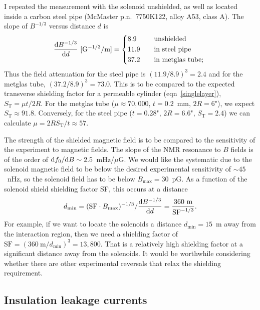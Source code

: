 I repeated the measurement with the solenoid unshielded, as well as located
inside a carbon steel pipe (McMaster p.n.\ 7750K122, alloy A53, class A). The
slope of $B^{-1/3}$ versus distance $d$ is
%
\[
    \frac{\d B^{-1/3}}{\d d}
    ~[\text{G}^{-1/3}/\text{m}]
    =
    \begin{dcases*}
         8.9&\quad unshielded\\
        11.9&\quad in steel pipe\\
        37.2&\quad in metglas tube;
    \end{dcases*}
\]
%
Thus the field attenuation for the steel pipe is $(11.9/8.9)^3=2.4$ and for the
metglas tube, $(37.2/8.9)^3=73.0$. This is to be compared to the expected
transverse shielding factor for a permeable cylinder (eqn~\ref{singlelayer}), 
$S_\text{T}=\mu t/2R$. For the metglas tube ($\mu\approx70,000$,
$t=0.2$~mm, $2R=6$"), we expect $S_\text{T}\approx91.8$. Conversely, for the
steel pipe ($t=0.28$", $2R=6.6$", $S_\text{T}=2.4$) we can calculate
$\mu=2RS_\text{T}/t\approx57$.

The strength of the shielded magnetic field is to be compared to the sensitivity
of the experiment to magnetic fields. The slope of the \gls{NMR} resonance to
$B$ fields is of the order of $\mathrm{d} f_0/\mathrm{d} B\sim2.5$~mHz/$\mu$G. We would like the
systematic due to the solenoid magnetic field to be below the desired
experimental sensitivity of $\sim45$~nHz, so the solenoid field has to be below
$B_\text{max}=30$~pG. As a function of the solenoid shield shielding factor SF,
this occurs at a distance
%
\[
    d_\text{min}=
    (\text{SF}\cdot B_\text{max})^{-1/3}/
    \frac{\mathrm{d} B^{-1/3}}{\mathrm{d} d}
    =
    \frac{360~\text{m}}{\text{SF}^{-1/3}}.
\]
%
For example, if we want to locate the solenoids a distance $d_\text{min}=15$~m
away from the interaction region, then we need a shielding factor of
$\text{SF}=(360~\text{m}/d_\text{min})^3=13,800$. That is a relatively high
shielding factor at a significant distance away from the solenoids. It would be
worthwhile considering whether there are other experimental reversals that relax
the shielding requirement.

\subsection{Insulation leakage currents}

